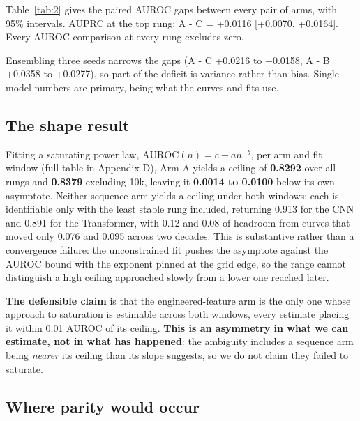 \documentclass[10pt,twocolumn,letterpaper]{article}
\begin{document}
Table~\ref{tab:2} gives the paired AUROC gaps between every pair of arms, with 95\% intervals. AUPRC at the top rung: A - C = +0.0116 [+0.0070, +0.0164]. Every AUROC comparison at every rung excludes zero.



Ensembling three seeds narrows the gaps (A - C +0.0216 to +0.0158, A - B +0.0358 to +0.0277), so part of the deficit is variance rather than bias. Single-model numbers are primary, being what the curves and fits use.



\subsection{The shape result}\label{sec:4.3}



Fitting a saturating power law, $\mathrm{AUROC}(n) = c - a n^{-b}$, per arm and fit window (full table in Appendix D), Arm A yields a ceiling of \textbf{0.8292} over all rungs and \textbf{0.8379} excluding 10k, leaving it \textbf{0.0014 to 0.0100} below its own asymptote. Neither sequence arm yields a ceiling under both windows: each is identifiable only with the least stable rung included, returning 0.913 for the CNN and 0.891 for the Transformer, with 0.12 and 0.08 of headroom from curves that moved only 0.076 and 0.095 across two decades. This is substantive rather than a convergence failure: the unconstrained fit pushes the asymptote against the AUROC bound with the exponent pinned at the grid edge, so the range cannot distinguish a high ceiling approached slowly from a lower one reached later.



\textbf{The defensible claim} is that the engineered-feature arm is the only one whose approach to saturation is estimable across both windows, every estimate placing it within 0.01 AUROC of its ceiling. \textbf{This is an asymmetry in what we can estimate, not in what has happened}: the ambiguity includes a sequence arm being \emph{nearer} its ceiling than its slope suggests, so we do not claim they failed to saturate.



\subsection{Where parity would occur}\label{sec:4.4}
\end{document}
